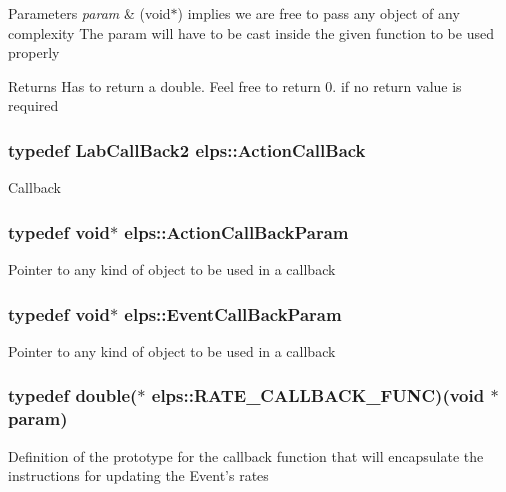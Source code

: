 \begin{DoxyParams}{Parameters}
{\em param} & (void$\ast$) implies we are free to pass any object of any complexity The param will have to be cast inside the given function to be used properly \\
\hline
\end{DoxyParams}
\begin{DoxyReturn}{Returns}
Has to return a double. Feel free to return 0. if no return value is required 
\end{DoxyReturn}
\hypertarget{namespaceelps_aa1ee9bc57556d61c2b7534818c6d5889}{
\subsubsection[{Action\+Call\+Back}]{\setlength{\rightskip}{0pt plus 5cm}typedef {\bf Lab\+Call\+Back2} {\bf elps\+::\+Action\+Call\+Back}}}\label{namespaceelps_aa1ee9bc57556d61c2b7534818c6d5889}
Callback \hypertarget{namespaceelps_a25715773cecbf210efb08dff37b7b013}{
\subsubsection[{Action\+Call\+Back\+Param}]{\setlength{\rightskip}{0pt plus 5cm}typedef void$\ast$ {\bf elps\+::\+Action\+Call\+Back\+Param}}}\label{namespaceelps_a25715773cecbf210efb08dff37b7b013}
Pointer to any kind of object to be used in a callback \hypertarget{namespaceelps_a1bd4230d698fa66dd38f0fc1cc5c2c55}{
\subsubsection[{Event\+Call\+Back\+Param}]{\setlength{\rightskip}{0pt plus 5cm}typedef void$\ast$ {\bf elps\+::\+Event\+Call\+Back\+Param}}}\label{namespaceelps_a1bd4230d698fa66dd38f0fc1cc5c2c55}
Pointer to any kind of object to be used in a callback \hypertarget{namespaceelps_a63a7933a53bef835381f77e30068cd60}{
\subsubsection[{R\+A\+T\+E\+\_\+\+C\+A\+L\+L\+B\+A\+C\+K\+\_\+\+F\+U\+N\+C}]{\setlength{\rightskip}{0pt plus 5cm}typedef double($\ast$ elps\+::\+R\+A\+T\+E\+\_\+\+C\+A\+L\+L\+B\+A\+C\+K\+\_\+\+F\+U\+N\+C)(void $\ast$param)}}\label{namespaceelps_a63a7933a53bef835381f77e30068cd60}
Definition of the prototype for the callback function that will encapsulate the instructions for updating the Event's rates


